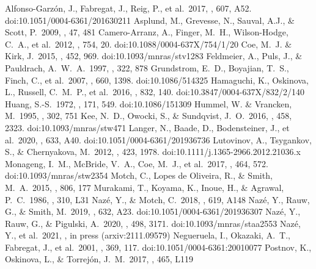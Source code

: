 \documentclass[a4paper,fleqn,usenatbib]{mnras}
\begin{document}
\begin{thebibliography}{99}
 Alfonso-Garz{\'o}n, J., Fabregat, J., Reig, P., et al.\ 2017, \aap, 607, A52. doi:10.1051/0004-6361/201630211
 Asplund, M., Grevesse, N., Sauval, A.J., \& Scott, P.\ 2009, \araa, 47, 481 
 Camero-Arranz, A., Finger, M.~H., Wilson-Hodge, C.~A., et al.\ 2012, \apj, 754, 20. doi:10.1088/0004-637X/754/1/20
 Coe, M.~J. \& Kirk, J.\ 2015, \mnras, 452, 969. doi:10.1093/mnras/stv1283
 Feldmeier, A., Puls, J., \& Pauldrach, A.~W.~A.\ 1997, \aap, 322, 878
 Grundstrom, E.~D., Boyajian, T.~S., Finch, C., et al.\ 2007, \apj, 660, 1398. doi:10.1086/514325
 Hamaguchi, K., Oskinova, L., Russell, C.~M.~P., et al.\ 2016, \apj, 832, 140. doi:10.3847/0004-637X/832/2/140
 Huang, S.-S.\ 1972, \apj, 171, 549. doi:10.1086/151309
 Hummel, W. \& Vrancken, M.\ 1995, \aap, 302, 751
 Kee, N.~D., Owocki, S., \& Sundqvist, J.~O.\ 2016, \mnras, 458, 2323. doi:10.1093/mnras/stw471
 Langer, N., Baade, D., Bodensteiner, J., et al.\ 2020, \aap, 633, A40. doi:10.1051/0004-6361/201936736
 Lutovinov, A., Tsygankov, S., \& Chernyakova, M.\ 2012, \mnras, 423, 1978. doi:10.1111/j.1365-2966.2012.21036.x
 Monageng, I.~M., McBride, V.~A., Coe, M.~J., et al.\ 2017, \mnras, 464, 572. doi:10.1093/mnras/stw2354
 Motch, C., Lopes de Oliveira, R., \& Smith, M.~A.\ 2015, \apj, 806, 177
 Murakami, T., Koyama, K., Inoue, H., \& Agrawal, P.~C.\ 1986, \apjl, 310, L31
 Naz{\'e}, Y., \& Motch, C.\ 2018, \aap, 619, A148
 Naz{\'e}, Y., Rauw, G., \& Smith, M.\ 2019, \aap, 632, A23. doi:10.1051/0004-6361/201936307
 Naz{\'e}, Y., Rauw, G., \& Pigulski, A.\ 2020, \mnras, 498, 3171. doi:10.1093/mnras/staa2553
 Naz{\'e}, Y., et al.\ 2021, \mnras, in press (arxiv:2111.09579)
 Negueruela, I., Okazaki, A.~T., Fabregat, J., et al.\ 2001, \aap, 369, 117. doi:10.1051/0004-6361:20010077
 Postnov, K., Oskinova, L., \& Torrej{\'o}n, J.~M.\ 2017, \mnras, 465, L119

\end{thebibliography}
\end{document}
